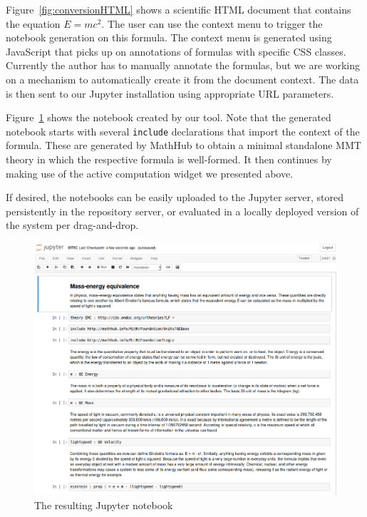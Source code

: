 Figure~\ref{fig:conversionHTML} shows a scientific HTML document that contains the equation $E=mc^2$.
The user can use the context menu to trigger the notebook generation on this formula.
The context menu is generated using JavaScript that picks up on annotations of formulas with specific CSS classes.
Currently the author has to manually annotate the formulas, but we are working on a mechanism to automatically create it from the document context.
The data is then sent to our Jupyter installation using appropriate URL parameters. 

Figure~\ref{fig:conversionNotebook} shows the notebook created by our tool.
Note that the generated notebook starts with several \texttt{include} declarations that import the context of the formula.
These are generated by MathHub to obtain a minimal standalone MMT theory in which the respective formula is well-formed. 
It then continues by making use of the active computation widget we presented above. 

If desired, the notebooks can be easily uploaded to the Jupyter server, stored persistently in the repository server, or evaluated in a locally deployed version of the system per drag-and-drop.

\begin{figure}[ht]\centering
\includegraphics[width=15cm]{../D4.11/conversionNotebook}
\caption{The resulting Jupyter notebook}
\label{fig:conversionNotebook}
\end{figure}


